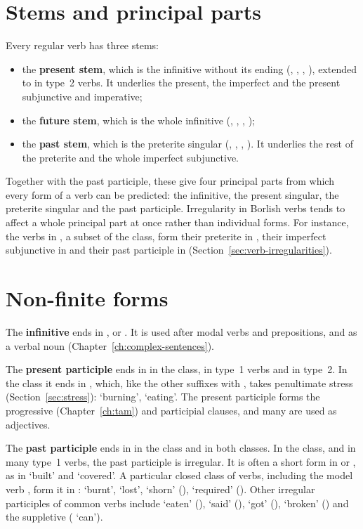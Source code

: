 \section{Stems and principal parts}\label{sec:principal-parts}
Every regular verb has three stems:
\begin{itemize}
    \item the \textbf{present stem}, which is the infinitive without its ending (, , , ), extended to  in type~2  verbs. It underlies the present, the imperfect and the present subjunctive and imperative;
    \item the \textbf{future stem}, which is the whole infinitive (, , , );
    \item the \textbf{past stem}, which is the preterite singular (, , , ). It underlies the rest of the preterite and the whole imperfect subjunctive.
\end{itemize}
Together with the past participle, these give four principal parts from which every form of a verb can be predicted: the infinitive, the present singular, the preterite singular and the past participle. Irregularity in Borlish verbs tends to affect a whole principal part at once rather than individual forms. For instance, the verbs in , a subset of the  class, form their preterite in , their imperfect subjunctive in  and their past participle in  (Section~\ref{sec:verb-irregularities}).

\section{Non-finite forms}\label{sec:nonfinite}
The \textbf{infinitive} ends in ,  or . It is used after modal verbs and prepositions, and as a verbal noun (Chapter~\ref{ch:complex-sentences}).

The \textbf{present participle} ends in  in the  class,  in type~1  verbs and  in type~2. In the  class it ends in , which, like the other suffixes with , takes penultimate stress (Section~\ref{sec:stress}):  `burning',   `eating'. The present participle forms the progressive (Chapter~\ref{ch:tam}) and participial clauses, and many are used as adjectives.

The \textbf{past participle} ends in  in the  class and  in both  classes. In the  class, and in many type~1  verbs, the past participle is irregular. It is often a short form in  or , as in  `built' and  `covered'. A particular closed class of verbs, including the model verb , form it in :  `burnt',  `lost',  `shorn' (),  `required' (). Other irregular participles of common verbs include  `eaten' (),  `said' (),  `got' (),  `broken' () and the suppletive  ( `can').


